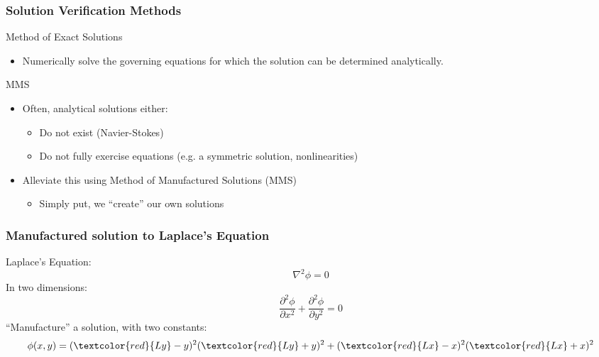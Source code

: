 \documentclass[mathserif]{beamer}
\begin{document}

\begin{frame}
  \frametitle{Solution Verification Methods}

  \begin{block}{Method of Exact Solutions}
    \begin{itemize}
      \item Numerically solve the governing equations for which the solution can be determined analytically.
    \end{itemize}
  \end{block}
  
  \begin{block}{MMS}
    \begin{itemize}
    \item Often, analytical solutions either:
    \begin{itemize}
      \item Do not exist (Navier-Stokes)
      \item Do not fully exercise equations (e.g. a symmetric
	solution, nonlinearities)
    \end{itemize}
    \item Alleviate this using Method of Manufactured Solutions (MMS)
      \begin{itemize}
      \item  Simply put, we ``create'' our own solutions
      \end{itemize}
    \end{itemize}
  \end{block}
  
\end{frame}


\begin{frame}
  \frametitle{Manufactured solution to Laplace's Equation}
  
  Laplace's Equation:
  \begin{equation}
      \nonumber      
    \nabla^2 \phi = 0
  \end{equation}
  In two dimensions:
  \begin{equation}
      \nonumber      
    \frac{\partial^2 \phi}{\partial x^2} + \frac{\partial^2 \phi}{\partial y^2} = 0
  \end{equation}
  \newline
  \newline
  ``Manufacture'' a solution, with two constants:
  \begin{equation}
      \nonumber
    \phi(x,y) = (\textcolor{red}{Ly}-y)^2 (\textcolor{red}{Ly}+y)^2 + (\textcolor{red}{Lx}-x)^2 (\textcolor{red}{Lx}+x)^2
  \end{equation}  

\end{frame}
\end{document}
